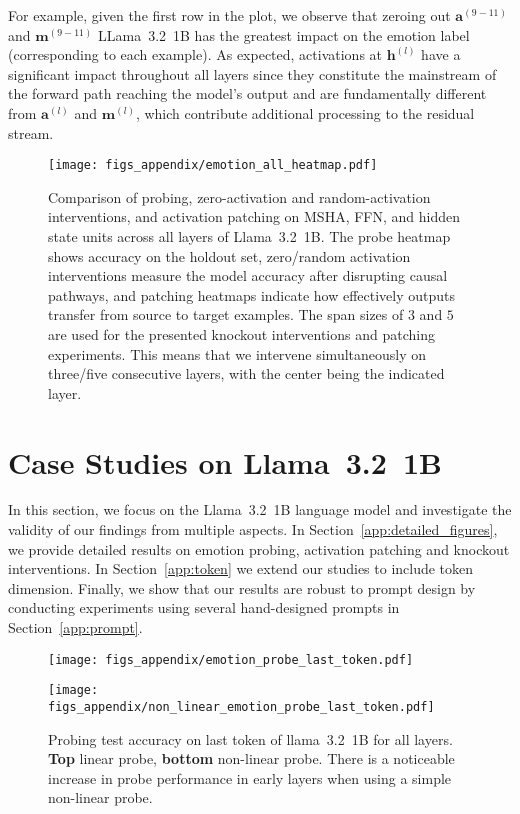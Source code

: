 For example, given the first row in the plot, we observe that zeroing out \( \mathbf{a}^{(9-11)} \) and \( \mathbf{m}^{(9-11)}\) LLama~3.2~1B has the greatest impact on the emotion label (corresponding to each example). As expected, activations at \( \mathbf{h}^{(l)} \) have a significant impact throughout all layers since they constitute the mainstream of the forward path reaching the model's output and are fundamentally different from \( \mathbf{a}^{(l)} \) and \( \mathbf{m}^{(l)} \), which contribute additional processing to the residual stream. 

\clearpage
\begin{sidewaysfigure*}[bht]
    \centering
    \texttt{[image: figs\_appendix/emotion\_all\_heatmap.pdf]}
    \caption{
    Comparison of probing, zero-activation and random-activation interventions, and activation patching on MSHA, FFN, and hidden state units across all layers of Llama~3.2~1B.  
    The probe heatmap shows accuracy on the holdout set, zero/random activation interventions measure the model accuracy after disrupting causal pathways, and patching heatmaps indicate how effectively outputs transfer from source to target examples. The span sizes of $3$ and $5$ are used for the presented knockout interventions and patching experiments. This means that we intervene simultaneously on three/five consecutive layers, with the center being the indicated layer.
    }
    \label{fig:zero_all}
\end{sidewaysfigure*}
\clearpage



\clearpage
\section{Case Studies on Llama~3.2~1B}
In this section, we focus on the Llama~3.2~1B language model and investigate the validity of our findings from multiple aspects. In Section~\ref{app:detailed_figures}, we provide detailed results on emotion probing, activation patching and knockout interventions. In Section~\ref{app:token} we extend our studies to include token dimension. Finally, we show that our results are robust to prompt design by conducting experiments using several hand-designed prompts in Section~\ref{app:prompt}. 


\begin{figure}[bht]
    \centering
    \texttt{[image: figs\_appendix/emotion\_probe\_last\_token.pdf]}

    \texttt{[image: figs\_appendix/non\_linear\_emotion\_probe\_last\_token.pdf]}
    
  \caption{Probing test accuracy on last token of llama~3.2~1B for all layers. \textbf{Top} linear probe, \textbf{bottom} non-linear probe. There is a noticeable increase in probe performance in early layers when using a simple non-linear probe.}
  \label{fig:Llama1B_probe}
\end{figure} 


